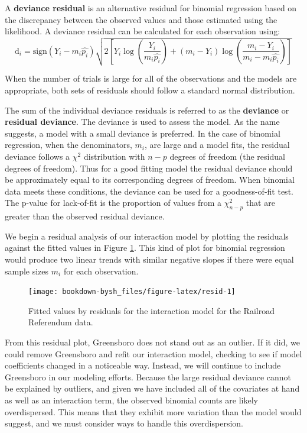 \documentclass[
]{krantz}
\begin{document}
A \textbf{deviance residual} is an alternative residual for binomial regression based on the discrepancy between the observed values and those estimated using the likelihood.
A deviance residual can be calculated for each observation using:
\begin{equation}
\textrm{d}_i = 
\textrm{sign}(Y_i-m_i\hat{p_i})\sqrt{2[Y_i \log\left(\frac{Y_i}{m_i \hat{p_i}}\right)+
(m_i - Y_i) \log\left(\frac{m_i - Y_i}{m_i - m_i \hat{p_i}}\right)]}
\label{eq:devianceBinom}
\end{equation}

When the number of trials is large for all of the observations and the models are appropriate, both sets of residuals should follow a standard normal distribution.

The sum of the individual deviance residuals is referred to as the \textbf{deviance} or \textbf{residual deviance}. The deviance is used to assess the model. As the name suggests, a model with a small deviance is preferred. In the case of binomial regression, when the denominators, \(m_i\), are large and a model fits, the residual deviance follows a \(\chi^2\) distribution with \(n-p\) degrees of freedom (the residual degrees of freedom). Thus for a good fitting model the residual deviance should be approximately equal to its corresponding degrees of freedom. When binomial data meets these conditions, the deviance can be used for a goodness-of-fit test. The p-value for lack-of-fit is the proportion of values from a \(\chi_{n-p}^2\) that are greater than the observed residual deviance.

We begin a residual analysis of our interaction model by plotting the residuals against the fitted values in Figure \ref{fig:resid}. This kind of plot for binomial regression would produce two linear trends with similar negative slopes if there were equal sample sizes \(m_i\) for each observation.

\begin{figure}

{\centering \texttt{[image: bookdown-bysh\_files/figure-latex/resid-1]} 

}

\caption{Fitted values by residuals for the interaction model for the Railroad Referendum data.}\label{fig:resid}
\end{figure}

From this residual plot, Greensboro does not stand out as an outlier. If it did, we could remove Greensboro and refit our interaction model, checking to see if model coefficients changed in a noticeable way. Instead, we will continue to include Greensboro in our modeling efforts. Because the large residual deviance cannot be explained by outliers, and given we have included all of the covariates at hand as well as an interaction term, the observed binomial counts are likely overdispersed. This means that they exhibit more variation than the model would suggest, and we must consider ways to handle this overdispersion.
\end{document}
